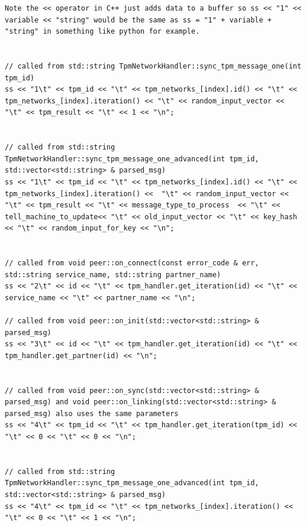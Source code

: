 \begin{lstlisting}
Note the << operator in C++ just adds data to a buffer so ss << "1" << variable << "string" would be the same as ss = "1" + variable + "string" in something like python for example.


// called from std::string TpmNetworkHandler::sync_tpm_message_one(int tpm_id)
ss << "1\t" << tpm_id << "\t" << tpm_networks_[index].id() << "\t" << tpm_networks_[index].iteration() << "\t" << random_input_vector << "\t" << tpm_result << "\t" << 1 << "\n";
  
  
// called from std::string TpmNetworkHandler::sync_tpm_message_one_advanced(int tpm_id, std::vector<std::string> & parsed_msg)
ss << "1\t" << tpm_id << "\t" << tpm_networks_[index].id() << "\t" << tpm_networks_[index].iteration() <<  "\t" << random_input_vector << "\t" << tpm_result << "\t" << message_type_to_process  << "\t" << tell_machine_to_update<< "\t" << old_input_vector << "\t" << key_hash << "\t" << random_input_for_key << "\n";


// called from void peer::on_connect(const error_code & err, std::string service_name, std::string partner_name)
ss << "2\t" << id << "\t" << tpm_handler.get_iteration(id) << "\t" << service_name << "\t" << partner_name << "\n";

// called from void peer::on_init(std::vector<std::string> & parsed_msg)
ss << "3\t" << id << "\t" << tpm_handler.get_iteration(id) << "\t" << tpm_handler.get_partner(id) << "\n";


// called from void peer::on_sync(std::vector<std::string> & parsed_msg) and void peer::on_linking(std::vector<std::string> & parsed_msg) also uses the same parameters
ss << "4\t" << tpm_id << "\t" << tpm_handler.get_iteration(tpm_id) << "\t" << 0 << "\t" << 0 << "\n";


// called from std::string TpmNetworkHandler::sync_tpm_message_one_advanced(int tpm_id, std::vector<std::string> & parsed_msg)
ss << "4\t" << tpm_id << "\t" << tpm_networks_[index].iteration() << "\t" << 0 << "\t" << 1 << "\n";
\end{lstlisting}

